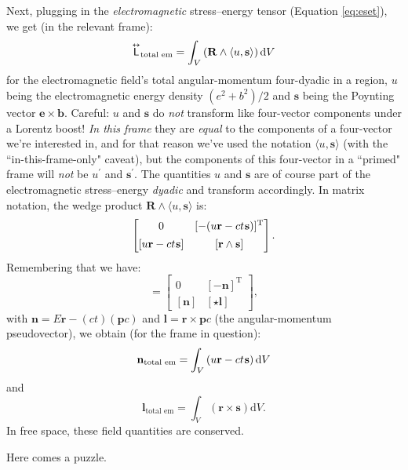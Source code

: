 \documentclass[12pt]{article}
\renewcommand{\vv}[1]{\mathbf{#1}}
\newcommand{\dd}[1]{\mathrm{d}#1}
\newcommand{\capdy}[1]{ \overset{ \text{\tiny$\bm\leftrightarrow$} }{\vphantom{\text{\small{A}}}\smash{#1}} }
\begin{document}
Next, plugging in the \emph{electromagnetic} stress--energy tensor (Equation \ref{eq:eset}), we get (in the relevant frame):
\begin{equation*}
\capdy{\mathsf{L}}_{\textrm{total em}} = \int_V \left( \vv R \wedge \langle u, \vv s \rangle \right) \dd V
\end{equation*}
for the electromagnetic field's total angular-momentum four-dyadic in a region, $u$ being the electromagnetic energy density $(e^2 + b^2)/2$ and $\vv s$ being the Poynting vector $\vv e \times \vv b$. Careful: $u$ and $\vv s$ do \emph{not} transform like four-vector components under a Lorentz boost! \emph{In this frame} they are \emph{equal} to the components of a four-vector we're interested in, and for that reason we've used the notation $\langle u, \vv s \rangle$ (with the ``in-this-frame-only" caveat), but the components of this four-vector in a ``primed" frame will \emph{not} be $u^\prime$ and $\vv s ^\prime$. The quantities $u$ and $\vv s$ are of course part of the electromagnetic stress--energy \emph{dyadic} and transform accordingly. In matrix notation, the wedge product $\vv R \wedge \langle u, \vv s \rangle$ is:
\begin{equation*}
\begin{bmatrix}
0 & [ - (u \vv r - ct \mkern1mu \vv s ) ]^\mathrm{T} \\[1ex]
[ u \vv r - ct \mkern1mu \vv s ] & [ \vv r \wedge \vv s ]
\end{bmatrix} .
\end{equation*}
Remembering that we have:
\begin{equation*}
[ \capdy{\mathsf{L}} ]
=
\begin{bmatrix}
0 & [ - \vv n ]^\mathrm{T} \\[1ex]
[ \vv n ] & [ \star \vv l ]
\end{bmatrix} ,
\end{equation*}
with ${\vv n = E \vv r - (ct)(\vv p c)}$ and $\vv l = \vv r \times \vv pc$ (the angular-momentum pseudovector), we obtain (for the frame in question):
\begin{equation*}
\vv n_{\textrm{total em}} = \int_V \left( u \vv r - ct \mkern1mu \vv s \right) \dd V
\end{equation*}
and
\begin{equation*}
\vv l_{\textrm{total em}} = \int_V \left( \vv r \times \vv s \right) \dd V .
\end{equation*}
In free space, these field quantities are conserved.

Here comes a puzzle.
\end{document}
